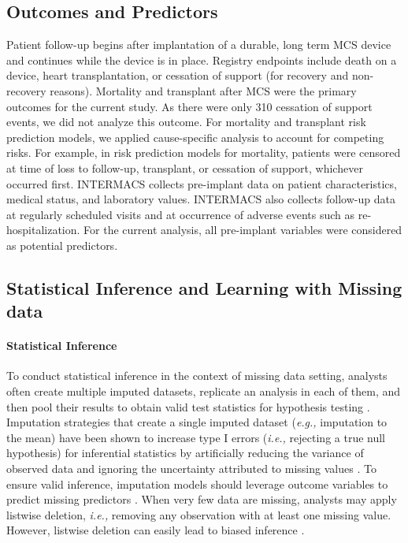 \documentclass{article}
\begin{document}
\hypertarget{outcomes-and-predictors}{%
\subsection{Outcomes and Predictors}\label{outcomes-and-predictors}}

Patient follow-up begins after implantation of a durable, long term MCS
device and continues while the device is in place. Registry endpoints
include death on a device, heart transplantation, or cessation of
support (for recovery and non-recovery reasons). Mortality and
transplant after MCS were the primary outcomes for the current study. As
there were only 310 cessation of support events, we did not analyze this
outcome. For mortality and transplant risk prediction models, we applied
cause-specific analysis to account for competing risks. For example, in
risk prediction models for mortality, patients were censored at time of
loss to follow-up, transplant, or cessation of support, whichever
occurred first. INTERMACS collects pre-implant data on patient
characteristics, medical status, and laboratory values. INTERMACS also
collects follow-up data at regularly scheduled visits and at occurrence
of adverse events such as re-hospitalization. For the current analysis,
all pre-implant variables were considered as potential predictors.

\hypertarget{statistical-inference-and-learning-with-missing-data}{%
\subsection{Statistical Inference and Learning with Missing
data}\label{statistical-inference-and-learning-with-missing-data}}

\label{subsec:inference_and_learning}

\paragraph{Statistical Inference}

To conduct statistical inference in the context of missing data setting,
analysts often create multiple imputed datasets, replicate an analysis
in each of them, and then pool their results to obtain valid test
statistics for hypothesis testing \cite{rubin2004multiple}. Imputation
strategies that create a single imputed dataset
(\textit{e.g., }imputation to the mean) have been shown to increase type
I errors (\textit{i.e., }rejecting a true null hypothesis) for
inferential statistics by artificially reducing the variance of observed
data and ignoring the uncertainty attributed to missing values
\cite{van2018flexible}. To ensure valid inference, imputation models
should leverage outcome variables to predict missing predictors
\cite{sterne2009multiple}. When very few data are missing, analysts may
apply listwise deletion, \textit{i.e., }removing any observation with at
least one missing value. However, listwise deletion can easily lead to
biased inference \cite{van2020rebutting}.
\end{document}
